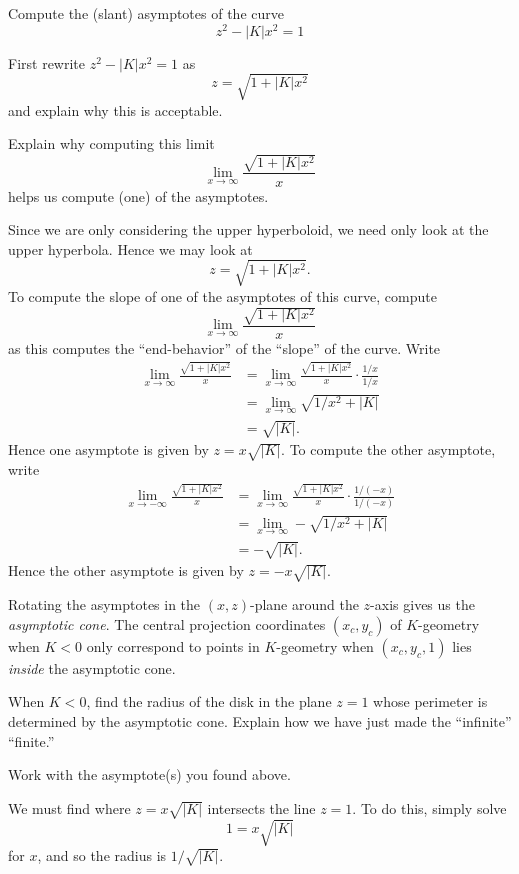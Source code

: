 \documentclass{ximera}
\begin{document}
\begin{problem}
  Compute the (slant) asymptotes of the curve
  \[
  z^{2}-\left\vert K\right\vert x^{2}= 1
  \]
  \begin{hint}
    First rewrite $z^{2}-|K|x^{2} =1$ as
    \[
    z = \sqrt{1+|K|x^2}
    \]
    and explain why this is acceptable.
  \end{hint}
  \begin{hint}
    Explain why computing this limit
    \[
    \lim_{x\to \infty} \frac{\sqrt{1+|K|x^2}}{x}
    \]
    helps us compute (one) of the asymptotes.
  \end{hint}
  \begin{freeResponse}
    Since we are only considering the upper hyperboloid, we need only
    look at the upper hyperbola. Hence we may look at
     \[
    z = \sqrt{1+|K|x^2}.
    \]
    To compute the slope of one of the asymptotes of this curve,
    compute
    \[
    \lim_{x\to \infty} \frac{\sqrt{1+|K|x^2}}{x}
    \]
    as this computes the ``end-behavior'' of the ``slope'' of the
    curve. Write
    \begin{align*}
      \lim_{x\to \infty} \frac{\sqrt{1+|K|x^2}}{x} &= \lim_{x\to \infty} \frac{\sqrt{1+|K|x^2}}{x}\cdot \frac{1/x}{1/x}\\
      &= \lim_{x\to \infty} \sqrt{1/x^2+|K|}\\
      &= \sqrt{|K|}.
    \end{align*}
    Hence one asymptote is given by $z = x\sqrt{|K|}$. To compute the other asymptote, write
    \begin{align*}
      \lim_{x\to -\infty} \frac{\sqrt{1+|K|x^2}}{x} &= \lim_{x\to \infty} \frac{\sqrt{1+|K|x^2}}{x}\cdot \frac{1/(-x)}{1/(-x)}\\
      &= \lim_{x\to \infty} -\sqrt{1/x^2+|K|}\\
      &= -\sqrt{|K|}.
    \end{align*}
    Hence the other asymptote is given by $z = -x\sqrt{|K|}$.
  \end{freeResponse}
\end{problem}


Rotating the asymptotes in the $(x,z)$-plane around the $z$-axis gives
us the \textit{asymptotic cone}.  The central projection coordinates
$(x_{c},y_{c})$ of $K$-geometry when $K<0$ only correspond to points
in $K$-geometry when $(x_{c},y_{c},1)$ lies \textit{inside} the
asymptotic cone.

\begin{problem}
  When $K<0$, find the radius of the disk in the plane $z=1$ whose
  perimeter is determined by the asymptotic cone. Explain how we have
  just made the ``infinite'' ``finite.''
  \begin{hint}
    Work with the asymptote(s) you found above.
  \end{hint}
  \begin{freeResponse}
    We must find where $z = x\sqrt{|K|}$ intersects the line $z=1$. To do this, simply solve
    \[
    1 = x\sqrt{|K|}
    \]
    for $x$, and so the radius is $1/\sqrt{|K|}$.
  \end{freeResponse}
\end{problem}
\end{document}
